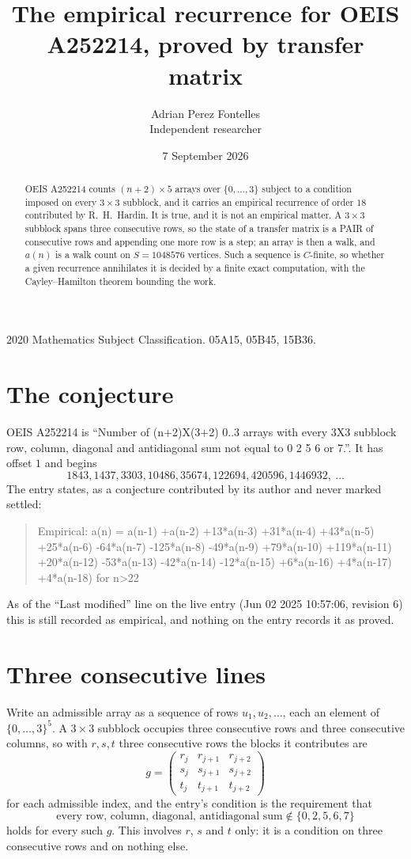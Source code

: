 \documentclass[11pt,a4paper]{article}
\title{The empirical recurrence for OEIS A252214, proved by transfer matrix}
\author{Adrian Perez Fontelles\\ \small Independent researcher}
\date{7 September 2026}
\theoremstyle{plain}
\theoremstyle{definition}
\begin{document}
\maketitle

\begin{abstract}
OEIS A252214 counts $(n+2)\times5$ arrays over $\{0,\dots,3\}$ subject to a condition imposed on
every $3\times3$ subblock, and it carries an empirical recurrence of order $18$
contributed by R.~H.~Hardin. It is true, and it is not an empirical matter. A $3\times3$
subblock spans three consecutive rows, so the state of a transfer matrix is a PAIR of
consecutive rows and appending one more row is a step; an array is then a walk, and
$a(n)$ is a walk count on $S=1048576$ vertices. Such a sequence is $C$-finite, so whether a given
recurrence annihilates it is decided by a finite exact computation, with the Cayley--Hamilton
theorem bounding the work.
\end{abstract}

\noindent\small 2020 Mathematics Subject Classification. 05A15, 05B45, 15B36.\normalsize

\section{The conjecture}

OEIS A252214 is ``Number of (n+2)X(3+2) 0..3 arrays with every 3X3 subblock row, column, diagonal and antidiagonal sum not equal to 0 2 5 6 or 7.''. It has offset $1$ and begins
\[
1843, 1437, 3303, 10486, 35674, 122694, 420596, 1446932,\ \dots
\]
The entry states, as a conjecture contributed by its author and never marked settled:
\begin{quote}
Empirical: a(n) = a(n-1) +a(n-2) +13*a(n-3) +31*a(n-4) +43*a(n-5) +25*a(n-6) -64*a(n-7) -125*a(n-8) -49*a(n-9) +79*a(n-10) +119*a(n-11) +20*a(n-12) -53*a(n-13) -42*a(n-14) -12*a(n-15) +6*a(n-16) +4*a(n-17) +4*a(n-18) for n>22
\end{quote}
As of the ``Last modified'' line on the live entry (Jun 02 2025 10:57:06, revision 6) this is still
recorded as empirical, and nothing on the entry records it as proved.

\section{Three consecutive lines}

Write an admissible array as a sequence of rows $u_1,u_2,\dots$, each an element of
$\{0,\dots,3\}^{5}$. A $3\times3$ subblock occupies three consecutive rows and
three consecutive columns, so with $r,s,t$ three consecutive rows the blocks it
contributes are
\[
g=\begin{pmatrix}r_j&r_{j+1}&r_{j+2}\\ s_j&s_{j+1}&s_{j+2}\\ t_j&t_{j+1}&t_{j+2}\end{pmatrix}
\]
for each admissible index, and the entry's condition is the requirement that
\[
\text{every row, column, diagonal, antidiagonal sum} \notin \{0,2,5,6,7\}
\]
holds for every such $g$. This involves $r$, $s$ and $t$ only: it is a condition on
three consecutive rows and on nothing else.
\end{document}
